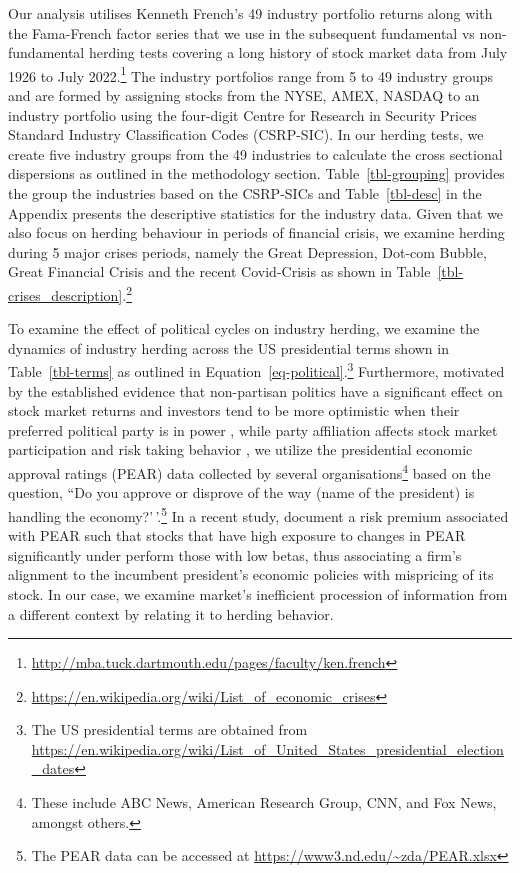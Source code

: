 \documentclass[
  letterpaper,
  DIV=11,
  numbers=noendperiod]{scrartcl}
\begin{document}
Our analysis utilises Kenneth French's 49 industry portfolio returns
along with the Fama-French factor series that we use in the subsequent
fundamental vs non-fundamental herding tests covering a long history of
stock market data from July 1926 to July 2022.\footnote{\url{http://mba.tuck.dartmouth.edu/pages/faculty/ken.french}}
The industry portfolios range from 5 to 49 industry groups and are
formed by assigning stocks from the NYSE, AMEX, NASDAQ to an industry
portfolio using the four-digit Centre for Research in Security Prices
Standard Industry Classification Codes (CSRP-SIC). In our herding tests,
we create five industry groups from the 49 industries to calculate the
cross sectional dispersions as outlined in the methodology section.
Table~\ref{tbl-grouping} provides the group the industries based on the
CSRP-SICs and Table~\ref{tbl-desc} in the Appendix presents the
descriptive statistics for the industry data. Given that we also focus
on herding behaviour in periods of financial crisis, we examine herding
during 5 major crises periods, namely the Great Depression, Dot-com
Bubble, Great Financial Crisis and the recent Covid-Crisis as shown in
Table~\ref{tbl-crises_description}.\footnote{\url{https://en.wikipedia.org/wiki/List_of_economic_crises}}

To examine the effect of political cycles on industry herding, we
examine the dynamics of industry herding across the US presidential
terms shown in Table~\ref{tbl-terms} as outlined in
Equation~\ref{eq-political}.\footnote{The US presidential terms are
  obtained from
  \url{https://en.wikipedia.org/wiki/List_of_United_States_presidential_election_dates}}
Furthermore, motivated by the established evidence that non-partisan
politics have a significant effect on stock market returns and investors
tend to be more optimistic when their preferred political party is in
power \citep{montone2022does}, while party affiliation affects stock
market participation \citep{kaustia2011stock} and risk taking behavior
\citep{bonaparte2017political}, we utilize the presidential economic
approval ratings (PEAR) data collected by several
organisations\footnote{These include ABC News, American Research Group,
  CNN, and Fox News, amongst others.} based on the question, ``Do you
approve or disprove of the way (name of the president) is handling the
economy?'\,'.\footnote{The PEAR data can be accessed at
  \url{https://www3.nd.edu/~zda/PEAR.xlsx}} In a recent study,
\citet{chen2023presidential} document a risk premium associated with
PEAR such that stocks that have high exposure to changes in PEAR
significantly under perform those with low betas, thus associating a
firm's alignment to the incumbent president's economic policies with
mispricing of its stock. In our case, we examine market's inefficient
procession of information from a different context by relating it to
herding behavior.
\end{document}
